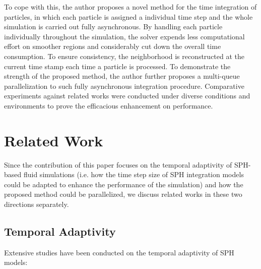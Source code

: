 \documentclass[
	11pt, 
	DIV10,
	ngerman,
	a4paper, 
	oneside, 
	headings=normal, 
	captions=tableheading,
	final, 
	numbers=noenddot
]{scrartcl}
\begin{document}
\par
To cope with this, the author proposes a novel method for the time integration of particles, in which each particle is assigned a individual time step and the whole simulation is carried out fully asynchronous. By handling each particle individually throughout the simulation, the solver expends less computational effort on smoother regions and considerably cut down the overall time consumption. To ensure consistency, the neighborhood is reconstructed at the current time stamp each time a particle is processed. To demonstrate the strength of the proposed method, the author further proposes a multi-queue parallelization to such fully asynchronous integration procedure. Comparative experiments against related works were conducted under diverse conditions and environments to prove the efficacious enhancement on performance.

\section{Related Work}

Since the contribution of this paper focuses on the temporal adaptivity of SPH-based fluid simulations (i.e. how the time step size of SPH integration models could be adapted to enhance the performance of the simulation) and how the proposed method could be parallelized, we discuss related works in these two directions separately.

\subsection{Temporal Adaptivity}

Extensive studies have been conducted on the temporal adaptivity of SPH models:
\end{document}
